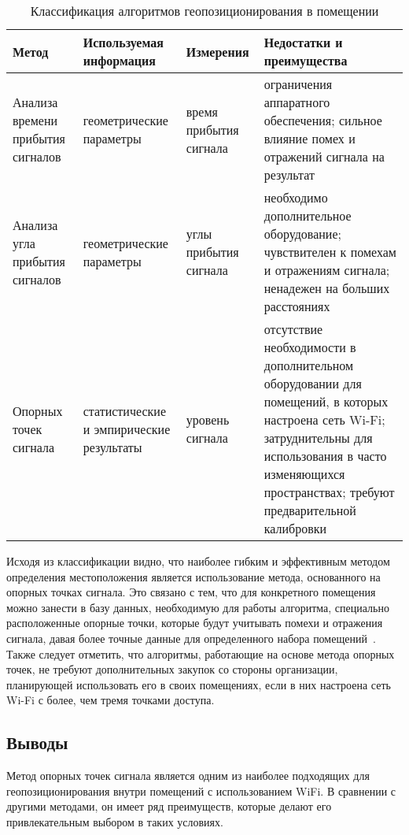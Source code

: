 \begin{table}[ht]
    \caption{Классификация алгоритмов геопозиционирования в помещении}
    \begin{tabular}{|m{3cm}|m{3.5cm}|m{3cm}|m{5.5cm}|}
        \hline
        Метод & Используемая информация & Измерения & Недостатки и преимущества \\
        \hline
        \hline
        Анализа времени прибытия сигналов & геометрические параметры & время прибытия сигнала & ограничения аппаратного обеспечения; сильное влияние помех и отражений сигнала на результат \\
        \hline
        Анализа угла прибытия сигналов & геометрические параметры & углы прибытия сигнала & необходимо дополнительное оборудование; чувствителен к помехам и отражениям сигнала; ненадежен на больших расстояниях \\
        \hline
        Опорных точек сигнала & статистические и эмпирические результаты & уровень сигнала & отсутствие необходимости в дополнительном оборудовании для помещений, в которых настроена сеть Wi-Fi; затруднительны для использования в часто изменяющихся пространствах; требуют предварительной калибровки \\
        \hline
    \end{tabular}
    \label{table:classification}
\end{table}

Исходя из классификации видно, что наиболее гибким и эффективным методом определения местоположения является использование метода, основанного на опорных точках сигнала. Это связано с тем, что для конкретного помещения можно занести в базу данных, необходимую для работы алгоритма, специально расположенные опорные точки, которые будут учитывать помехи и отражения сигнала, давая более точные данные для определенного набора помещений~\cite{bag}. Также следует отметить, что алгоритмы, работающие на основе метода опорных точек, не требуют дополнительных закупок со стороны организации, планирующей использовать его в своих помещениях, если в них настроена сеть Wi-Fi с более, чем тремя точками доступа.

\subsection{Выводы}

Метод опорных точек сигнала является одним из наиболее подходящих для геопозиционирования внутри помещений с использованием WiFi. В сравнении с другими методами, он имеет ряд преимуществ, которые делают его привлекательным выбором в таких условиях.

